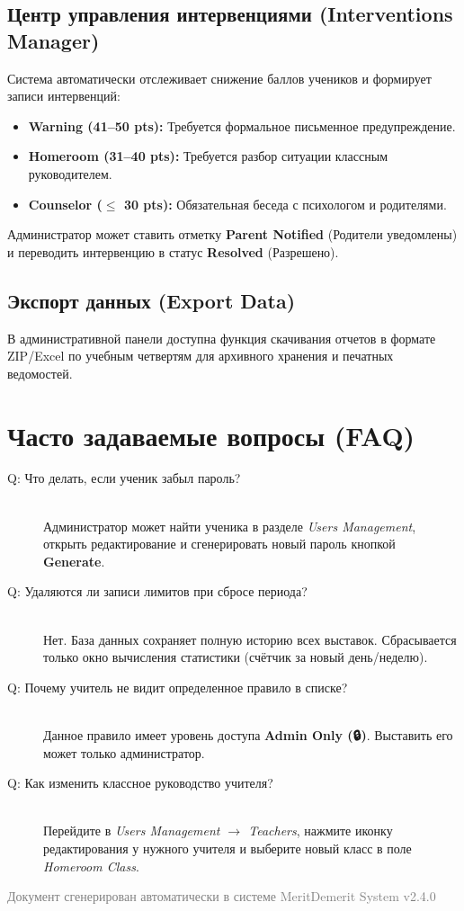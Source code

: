 \documentclass[12pt,a4paper]{article}
\begin{document}
\subsection{Центр управления интервенциями (Interventions Manager)}
Система автоматически отслеживает снижение баллов учеников и формирует записи интервенций:
\begin{itemize}
    \item \textbf{Warning (41--50 pts):} Требуется формальное письменное предупреждение.
    \item \textbf{Homeroom (31--40 pts):} Требуется разбор ситуации классным руководителем.
    \item \textbf{Counselor ($\le$ 30 pts):} Обязательная беседа с психологом и родителями.
\end{itemize}
Администратор может ставить отметку \textbf{Parent Notified} (Родители уведомлены) и переводить интервенцию в статус \textbf{Resolved} (Разрешено).

\subsection{Экспорт данных (Export Data)}
В административной панели доступна функция скачивания отчетов в формате ZIP/Excel по учебным четвертям для архивного хранения и печатных ведомостей.

\newpage

\section{Часто задаваемые вопросы (FAQ)}

\begin{description}
    \item[Q: Что делать, если ученик забыл пароль?] \hfill \\
    Администратор может найти ученика в разделе \textit{Users Management}, открыть редактирование и сгенерировать новый пароль кнопкой \textbf{Generate}.
    
    \item[Q: Удаляются ли записи лимитов при сбросе периода?] \hfill \\
    Нет. База данных сохраняет полную историю всех выставок. Сбрасывается только окно вычисления статистики (счётчик за новый день/неделю).
    
    \item[Q: Почему учитель не видит определенное правило в списке?] \hfill \\
    Данное правило имеет уровень доступа \textbf{Admin Only (🔒)}. Выставить его может только администратор.
    
    \item[Q: Как изменить классное руководство учителя?] \hfill \\
    Перейдите в \textit{Users Management $\rightarrow$ Teachers}, нажмите иконку редактирования у нужного учителя и выберите новый класс в поле \textit{Homeroom Class}.
\end{description}

\vfill
\begin{center}
    \textcolor{gray}{\small Документ сгенерирован автоматически в системе MeritDemerit System v2.4.0}
\end{center}
\end{document}
